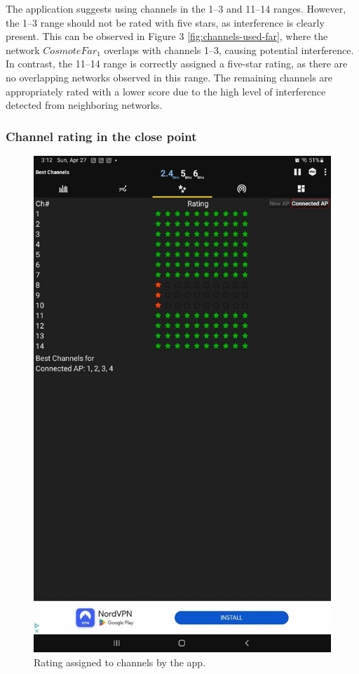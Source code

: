 \documentclass{article}
\begin{document}
The application suggests using channels in the 1–3 and 11–14 ranges.
However, the 1–3 range should not be rated with five stars, as interference is clearly present.
This can be observed in Figure 3 \ref{fig:channels-used-far}, where the network $CosmoteFar_1$ overlaps with channels 1–3, causing potential interference.
In contrast, the 11–14 range is correctly assigned a five-star rating, as there are no overlapping networks observed in this range.
The remaining channels are appropriately rated with a lower score due to the high level of interference detected from neighboring networks.

\subsubsection{Channel rating in the close point}
\begin{figure}[H]
    \centering
    \includegraphics[width=1\linewidth]{images/rating_close.jpg}
    \caption{Rating assigned to channels by the app.}
    \label{fig:rating-close}
\end{figure}
\end{document}
